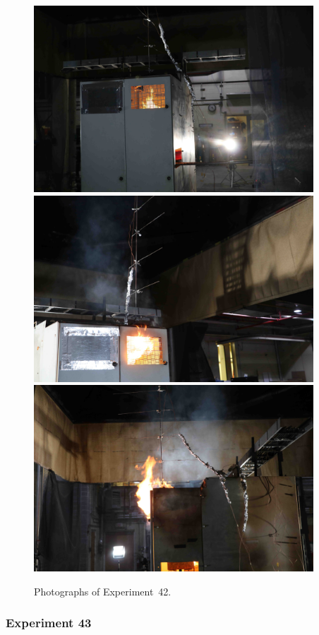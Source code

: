 \begin{figure}[p]
\centering
\includegraphics[height=2.75in]{../FIGURES/Test_42_start} \\
\includegraphics[height=2.75in]{../FIGURES/Test_42_rear} \\
\includegraphics[height=2.75in]{../FIGURES/Test_42_side}
\caption[Photographs of Experiment~42]{Photographs of Experiment~42.}
\label{fig:Test_42_photos}
\end{figure}


\clearpage

\subsubsection{Experiment 43}

